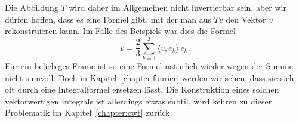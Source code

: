 Die Abbildung $T$ wird daher im Allgemeinen nicht invertierbar sein, aber
wir dürfen hoffen, dass es eine Formel gibt, mit der man aus $Tv$ den 
Vektor $v$ rekonstruieren kann.
Im Falle des Beispiels war dies die Formel
\[
v = \frac23 \sum_{k=1}^3 \langle v,e_k\rangle \, e_k.
\]
Für ein beliebiges Frame ist so eine Formel natürlich wieder wegen
der Summe nicht sinnvoll.
Doch in Kapitel~\ref{chapter:fourier} werden wir sehen, dass sie sich
oft durch eine Integralformel ersetzen lässt.
Die Konstruktion eines solchen vektorwertigen Integrals ist allerdings
etwas subtil, wird kehren zu dieser Problematik im Kapitel~\ref{chapter:cwt}
zurück.


